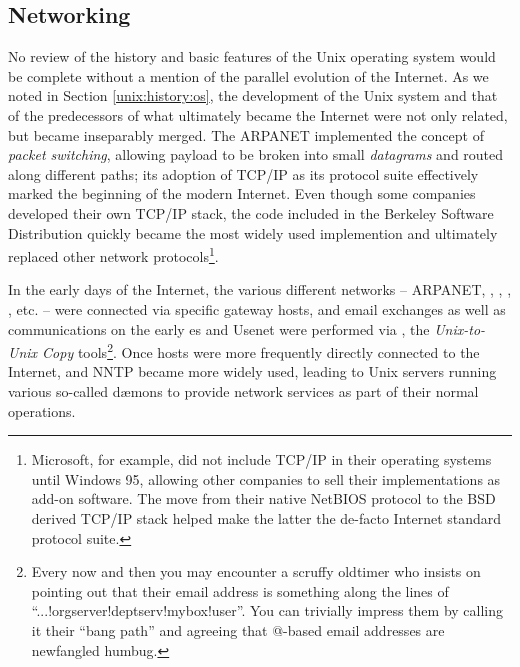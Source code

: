 \subsection{Networking}
\label{unix:networking}

No review of the history and basic features of the
Unix operating system would be complete without a
mention of the parallel evolution of the Internet.  As
we noted in Section \ref{unix:history:os}, the
development of the Unix system and that of the
predecessors of what ultimately became the Internet
were not only related, but became inseparably merged.
The ARPANET implemented the concept of
{\em packet switching},
allowing payload to be broken into small {\em
datagrams} and routed along different paths; its
adoption of TCP/IP\cite{history:cerf-kahn:tcp} as its
protocol suite effectively marked the beginning of the
modern Internet.  Even though some companies developed
their own TCP/IP stack, the code included in the
Berkeley Software Distribution quickly became the most
widely used implemention and ultimately replaced other
network protocols\footnote{Microsoft, for example, did
not include TCP/IP in their operating systems until
Windows 95, allowing other companies to sell their
implementations as add-on software.  The move from
their native  NetBIOS protocol to the
BSD derived TCP/IP stack helped make the latter the
de-facto Internet standard protocol suite.}.

In the early days of the Internet, the various
different networks -- ARPANET,
,
,
,
, etc. -- were connected
via specific gateway hosts, and email exchanges as
well as communications on the early
es and
Usenet were performed via
, the {\em Unix-to-Unix Copy}
tools\footnote{Every now and then you may encounter
a scruffy oldtimer who insists on pointing out that
their email address is something along the lines of
``...!orgserver!deptserv!mybox!user''. You can
trivially impress them by calling it their ``bang
path'' and agreeing that @-based email addresses are
newfangled humbug.}.  Once hosts were more frequently
directly connected to the Internet,
 and NNTP
became more widely used, leading to Unix servers
running various so-called  d\ae mons
to provide network services as part of their normal
operations.  \\

